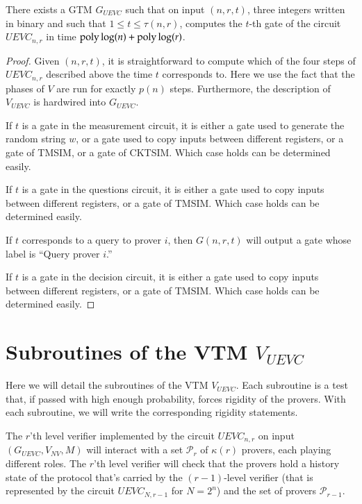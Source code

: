 \documentclass[11pt,letterpaper]{article}
\begin{document}
\begin{lemma}
	There exists a GTM $G_{UEVC}$ such that on input $(n,r,t)$, three integers written in binary and such that $1 \leq t \leq \tau(n,r)$, computes the $t$-th gate of the circuit $UEVC_{n,r}$ in time $\operatorname{poly}\log(n) + \operatorname{poly} \log(r)$.
\end{lemma}

\begin{proof}
	Given $(n,r,t)$, it is straightforward to compute which of the four steps of $UEVC_{n,r}$ described above the time $t$ corresponds to. Here we use the fact that the phases of $V$ are run for exactly $p(n)$ steps. Furthermore, the description of $V_{UEVC}$ is hardwired into $G_{UEVC}$.
	
	If $t$ is a gate in the measurement circuit, it is either a gate used to generate the random string $w$, or a gate used to copy inputs between different registers, or a gate of TMSIM, or a gate of CKTSIM. Which case holds can be determined easily.
	
	If $t$ is a gate in the questions circuit, it is either a gate used to copy inputs between different registers, or a gate of TMSIM. Which case holds can be determined easily.
	
	If $t$ corresponds to a query to prover $i$, then $G(n,r,t)$ will output a gate whose label is ``Query prover $i$.'' 
	
	If $t$ is a gate in the decision circuit, it is either a gate used to copy inputs between different registers, or a gate of TMSIM. Which case holds can be determined easily.
	

\end{proof}


\section{Subroutines of the VTM $V_{UEVC}$}

Here we will detail the subroutines of the VTM $V_{UEVC}$. Each subroutine is a test that, if passed with high enough probability, forces rigidity of the provers. With each subroutine, we will write the corresponding rigidity statements.

The $r$'th level verifier implemented by the circuit $UEVC_{n,r}$ on input $(G_{UEVC},V_{NV},M)$ will interact with a set $\mathcal{P}_r$ of $\kappa(r)$ provers, each playing different roles. The $r$'th level verifier will check that the provers hold a history state of the protocol that's carried by the $(r-1)$-level verifier (that is represented by the circuit $UEVC_{N,r-1}$ for $N = 2^n$) and the set of provers $\mathcal{P}_{r-1}$. 
\end{document}
